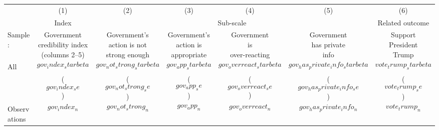 \begin{tabular}{l c c c c c c} 
  \hline
  \hline
  & (1) & (2) & (3) & (4) & (5) & (6) \\
  & Index & \multicolumn{4}{c}{Sub-scale} &
                                                             Related outcome \\
  \cmidrule(l){2-2} \cmidrule(l){3-6} \cmidrule(l){7-7} 
Sample: & \shortstack{Government \\ credibility index \\
  (columns 2--5) } &
                                                     \shortstack{Government's                     
                                                                    \\
  action
  is not \\ strong enough } &
                                                                \shortstack{Government's
  \\ action is 
  \\ appropriate}  & \shortstack{Government \\ is \\ over-reacting} &
                                                         \shortstack{Government \\
                                                         has private \\
  info} & \shortstack{Support \\ President \\ Trump} \\  
  \hline 
All  & $$gov_index_starbeta$$ & $$gov_not_strong_starbeta$$ & $$gov_app_starbeta$$ & $$gov_overreact_starbeta$$ & $$gov_has_private_info_starbeta$$
             & $$vote_trump_starbeta$$ \\ 
& ($$gov_index_se$$) & ($$gov_not_strong_se$$) & ($$gov_app_se$$) & ($$gov_overreact_se$$) & ($$gov_has_private_info_se$$)
                               & ($$vote_trump_se$$) \\
Observations & $$gov_index_n$$ & $$gov_not_strong_n$$ & $$gov_app_n$$ & $$gov_overreact_n$$ & $$gov_has_private_info_n$$
                                & $$vote_trump_n$$ \\


\end{tabular}

